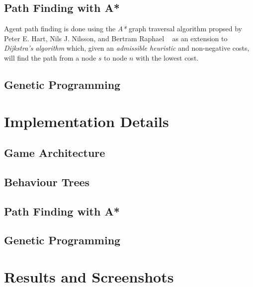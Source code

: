 \documentclass[a4paper, twocolumn]{article}
\begin{document}
        \subsection{Path Finding with A*} \label{sec:path_finding}

	Agent path finding is done using the \emph{A*} graph traversal algorithm propsed by Peter E. Hart, Nils J. Nilsson, and Bertram Raphael ~\cite{hart1968formal} as an extension to \emph{Dijkstra's algorithm} which, given an \emph{admissible heuristic} and non-negative costs, will find the path from a node \(s\) to node \(n\) with the lowest cost.
	

        \subsection{Genetic Programming} \label{sec:genetic_programming}



    \section{Implementation Details} \label{sec:implementation_details}



        \subsection{Game Architecture} \label{sec:game_architecture}



        \subsection{Behaviour Trees} \label{sec:behaviour_trees_implementation}



        \subsection{Path Finding with A*} \label{sec:path_finding_implementation}



        \subsection{Genetic Programming} \label{sec:genetic_programming_implementation}



    \section{Results and Screenshots} \label{sec:results_and_screenshots}
\end{document}
